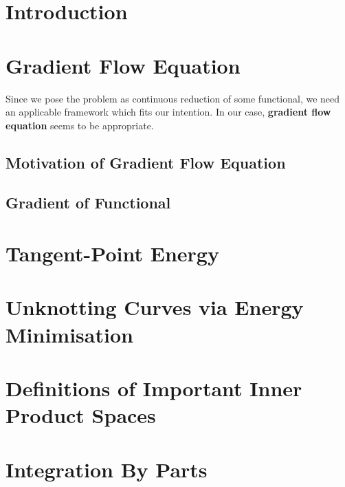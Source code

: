 \documentclass[a4paper, 12pt]{article}
\numberwithin{equation}{section}
\numberwithin{figure}{section}
\theoremstyle{definition}
\theoremstyle{plain}
\theoremstyle{plain}
\theoremstyle{plain}
\theoremstyle{remark}
\numberwithin{theorem}{section}
\begin{document}



\tableofcontents

\section{Introduction}


\section{Gradient Flow Equation}
Since we pose the problem as continuous reduction of some functional,
we need an applicable framework which fits our intention.
In our case, \textbf{gradient flow equation} seems to be appropriate.
\subsection{Motivation of Gradient Flow Equation}

\subsection{Gradient of Functional}


\section{Tangent-Point Energy}


\section{Unknotting Curves via Energy Minimisation}


\newpage
%
\begin{appendices}
    \section{Definitions of Important Inner Product Spaces}
    \label{sct: Definitions of Important Inner Product Spaces}
    
    \section{Integration By Parts}
    \label{sct: Integration By Parts}
    
\end{appendices}

\printbibliography
\end{document}
